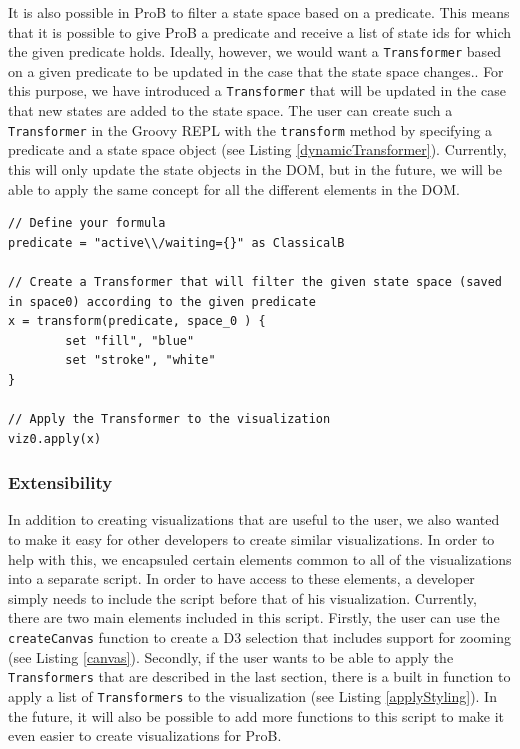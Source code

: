 It is also possible in ProB to filter a state space based on a predicate. This means that it is possible to give ProB a predicate and receive a list of state ids for which the given predicate holds. Ideally, however, we would want a \texttt{Transformer} based on a given predicate to be updated in the case that the state space changes.. For this purpose, we have introduced a \texttt{Transformer} that will be updated in the case that new states are added to the state space. The user can create such a \texttt{Transformer} in the Groovy REPL with the \texttt{transform} method by specifying a predicate and a state space object (see Listing \ref{dynamicTransformer}). Currently, this will only update the state objects in the DOM, but in the future, we will be able to apply the same concept for all the different elements in the DOM.

\begin{lstlisting}[caption=Create a \texttt{Transformer} based on the states that match a given predicate,label=dynamicTransformer]
// Define your formula
predicate = "active\\/waiting={}" as ClassicalB

// Create a Transformer that will filter the given state space (saved in space0) according to the given predicate
x = transform(predicate, space_0 ) {
		set "fill", "blue"
		set "stroke", "white"
}

// Apply the Transformer to the visualization
viz0.apply(x)
\end{lstlisting}

\subsubsection{Extensibility}

In addition to creating visualizations that are useful to the user, we also wanted to make it easy for other developers to create similar visualizations. In order to help with this, we encapsuled certain elements common to all of the visualizations into a separate script. In order to have access to these elements, a developer simply needs to include the script before that of his visualization. Currently, there are two main elements included in this script. Firstly, the user can use the \texttt{createCanvas} function to create a D3 selection that includes support for zooming (see Listing \ref{canvas}). Secondly, if the user wants to be able to apply the \texttt{Transformers} that are described in the last section, there is a built in function to apply a list of \texttt{Transformers} to the visualization (see Listing \ref{applyStyling}). In the future, it will also be possible to add more functions to this script to make it even easier to create visualizations for ProB.

